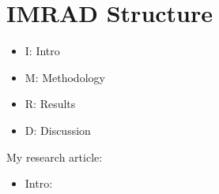 \section{IMRAD Structure}%
\label{sec:IMRAD Structure}
\begin{itemize}
    \item I: Intro
    \item M: Methodology
    \item R: Results
    \item D: Discussion
\end{itemize}
My research article:
\begin{itemize}
    \item Intro:
    
\end{itemize}
